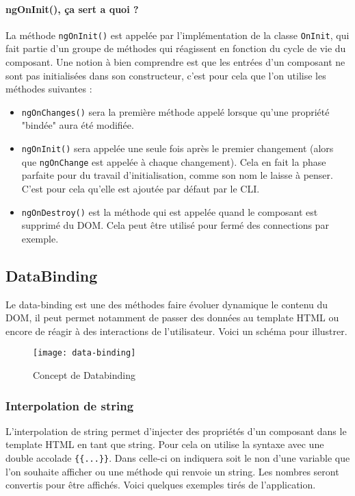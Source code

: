 \paragraph{ngOnInit(), ça sert a quoi ?}

La méthode \texttt{ngOnInit()} est appelée par l'implémentation de la classe \texttt{OnInit}, qui fait partie d'un groupe de méthodes qui réagissent en fonction du cycle de vie du composant. Une notion à bien comprendre est que les entrées d'un composant ne sont pas initialisées dans son constructeur, c'est pour cela que l'on utilise les méthodes suivantes :

\begin{itemize}
	\item \texttt{ngOnChanges()} sera la première méthode appelé lorsque qu'une propriété "bindée" aura été modifiée.
	\item \texttt{ngOnInit()} sera appelée une seule fois après le premier changement (alors que \texttt{ngOnChange} est appelée à chaque changement). Cela en fait la phase parfaite pour du travail d’initialisation, comme son nom le laisse à penser. C'est pour cela qu'elle est ajoutée par défaut par le CLI.
	\item \texttt{ngOnDestroy()} est la méthode qui est appelée quand le composant est supprimé du DOM. Cela peut être utilisé pour fermé des connections par exemple.
\end{itemize}

\subsection{DataBinding}

Le data-binding est une des méthodes faire évoluer dynamique le contenu du DOM, il peut permet notamment de passer des données au template HTML ou encore de réagir à des interactions de l'utilisateur. Voici un schéma pour illustrer.
\begin{figure}[h]
	\centering
	\texttt{[image: data-binding]}
	\caption{Concept de Databinding}
	\label{databinding}
\end{figure}

\subsubsection{Interpolation de string}
L'interpolation de string permet d'injecter des propriétés d'un composant dans le template HTML en tant que string. Pour cela on utilise la syntaxe avec une double accolade \texttt{\{\{...\}\}}. Dans celle-ci on indiquera soit le non d'une variable que l'on souhaite afficher ou une méthode qui renvoie un string. Les nombres seront convertis pour être affichés. Voici quelques exemples tirés de l'application.

